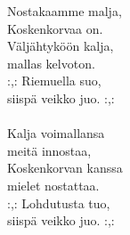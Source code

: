 
            Nostakaamme malja, \\
            Koskenkorvaa on. \\
            Väljähtyköön kalja, \\
            mallas kelvoton. \\
            :,: Riemuella suo, \\
            siispä veikko juo. :,: \\
\hspace{10mm} \\
            Kalja voimallansa \\
            meitä innostaa, \\
            Koskenkorvan kanssa \\
            mielet nostattaa. \\
            :,: Lohdutusta tuo, \\
            siispä veikko juo. :,: \\
